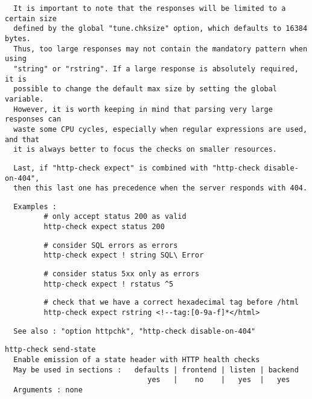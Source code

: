\begin{verbatim}
  It is important to note that the responses will be limited to a certain size
  defined by the global "tune.chksize" option, which defaults to 16384 bytes.
  Thus, too large responses may not contain the mandatory pattern when using
  "string" or "rstring". If a large response is absolutely required, it is
  possible to change the default max size by setting the global variable.
  However, it is worth keeping in mind that parsing very large responses can
  waste some CPU cycles, especially when regular expressions are used, and that
  it is always better to focus the checks on smaller resources.
\end{verbatim}

\begin{verbatim}
  Last, if "http-check expect" is combined with "http-check disable-on-404",
  then this last one has precedence when the server responds with 404.
\end{verbatim}

\begin{verbatim}
  Examples :
         # only accept status 200 as valid
         http-check expect status 200
\end{verbatim}

\begin{verbatim}
         # consider SQL errors as errors
         http-check expect ! string SQL\ Error
\end{verbatim}

\begin{verbatim}
         # consider status 5xx only as errors
         http-check expect ! rstatus ^5
\end{verbatim}

\begin{verbatim}
         # check that we have a correct hexadecimal tag before /html
         http-check expect rstring <!--tag:[0-9a-f]*</html>
\end{verbatim}

\begin{verbatim}
  See also : "option httpchk", "http-check disable-on-404"
\end{verbatim}

\begin{verbatim}
http-check send-state
  Enable emission of a state header with HTTP health checks
  May be used in sections :   defaults | frontend | listen | backend
                                 yes   |    no    |   yes  |   yes
  Arguments : none
\end{verbatim}

